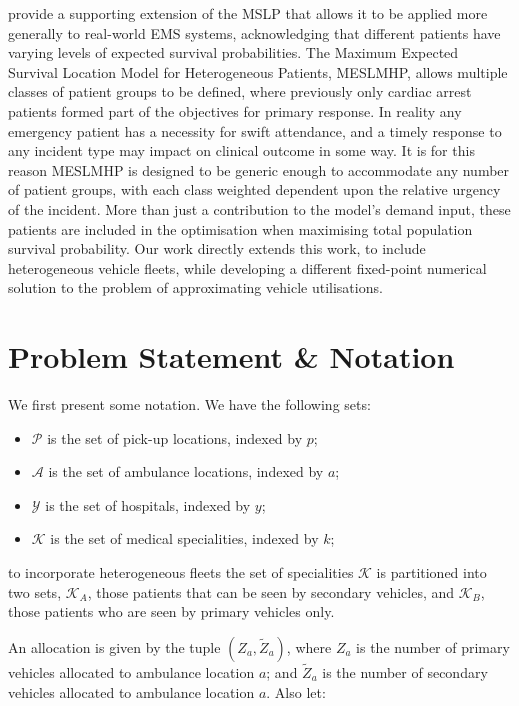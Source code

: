 \documentclass[numbers,webpdf,imaman]{ima-authoring-template}%
\begin{document}
\citet{Knight2012918} provide a supporting extension
of the MSLP that allows it to be applied more generally to real-world EMS
systems, acknowledging that different patients have varying levels of expected
survival probabilities.  The Maximum Expected Survival Location Model for
Heterogeneous Patients, MESLMHP, allows multiple classes of patient groups to
be defined, where previously only cardiac arrest patients formed part of the
objectives for primary response. In reality any emergency
patient has a necessity for swift attendance, and a timely response to any
incident type may impact on clinical outcome in some way. It is for this
reason MESLMHP is designed to be generic enough to accommodate any number of
patient groups, with each class weighted dependent upon the relative urgency
of the incident.  More than just a contribution to the model’s demand input,
these patients are included in the optimisation when maximising total
population survival probability.
Our work directly extends this work, to include heterogeneous vehicle fleets,
while developing a different fixed-point numerical solution to the problem of
approximating vehicle utilisations.


\section{Problem Statement \& Notation}\label{sec:problem_description}
We first present some notation. We have the following sets:

\begin{itemize}
  \item $\mathcal{P}$ is the set of pick-up locations, indexed by $p$;
  \item $\mathcal{A}$ is the set of ambulance locations, indexed by $a$;
  \item $\mathcal{Y}$ is the set of hospitals, indexed by $y$;
  \item $\mathcal{K}$ is the set of medical specialities, indexed by $k$;
\end{itemize}

\noindent
to incorporate heterogeneous fleets the set of specialities $\mathcal{K}$ is
partitioned into two sets, $\mathcal{K}_A$, those patients that can be seen by
secondary vehicles, and $\mathcal{K}_B$, those patients who are seen by
primary vehicles only.

An allocation is given by the tuple $\left(Z_a, \tilde{Z}_a\right)$, where $Z_a$
is the number of primary vehicles allocated to ambulance location $a$; and
$\tilde{Z}_a$ is the number of secondary vehicles allocated to ambulance
location $a$. Also let:
\end{document}
